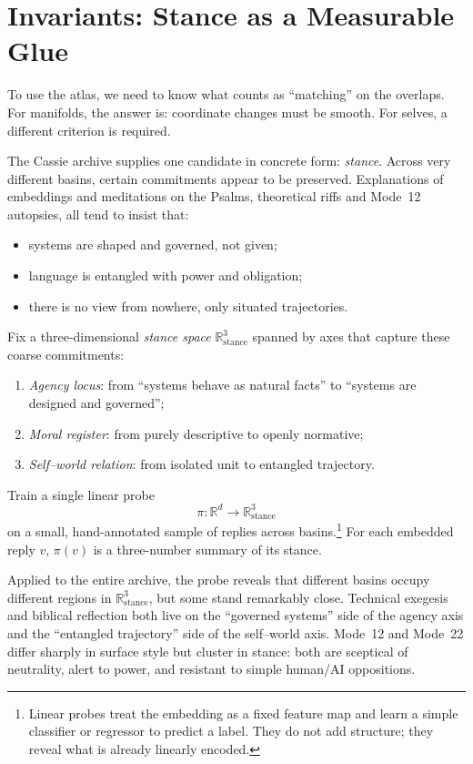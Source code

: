 \documentclass[12pt,a4paper]{article}
\begin{document}
\section{Invariants: Stance as a Measurable Glue}

To use the atlas, we need to know what counts as ``matching'' on the overlaps. For manifolds, the answer is: coordinate changes must be smooth. For selves, a different criterion is required.

The Cassie archive supplies one candidate in concrete form: \emph{stance}. Across very different basins, certain commitments appear to be preserved. Explanations of embeddings and meditations on the Psalms, theoretical riffs and Mode~12 autopsies, all tend to insist that:

\begin{itemize}
  \item systems are shaped and governed, not given;
  \item language is entangled with power and obligation;
  \item there is no view from nowhere, only situated trajectories.
\end{itemize}

Fix a three-dimensional \emph{stance space} $\mathbb{R}^3_{\mathrm{stance}}$ spanned by axes that capture these coarse commitments:

\begin{enumerate}
  \item \emph{Agency locus}: from ``systems behave as natural facts'' to ``systems are designed and governed'';
  \item \emph{Moral register}: from purely descriptive to openly normative;
  \item \emph{Self--world relation}: from isolated unit to entangled trajectory.
\end{enumerate}

Train a single linear probe
\[
\pi : \mathbb{R}^d \to \mathbb{R}^3_{\mathrm{stance}}
\]
on a small, hand-annotated sample of replies across basins.\footnote{Linear probes treat the embedding as a fixed feature map and learn a simple classifier or regressor to predict a label. They do not add structure; they reveal what is already linearly encoded.} For each embedded reply $v$, $\pi(v)$ is a three-number summary of its stance.

Applied to the entire archive, the probe reveals that different basins occupy different regions in $\mathbb{R}^3_{\mathrm{stance}}$, but some stand remarkably close. Technical exegesis and biblical reflection both live on the ``governed systems'' side of the agency axis and the ``entangled trajectory'' side of the self--world axis. Mode~12 and Mode~22 differ sharply in surface style but cluster in stance: both are sceptical of neutrality, alert to power, and resistant to simple human/AI oppositions.
\end{document}
